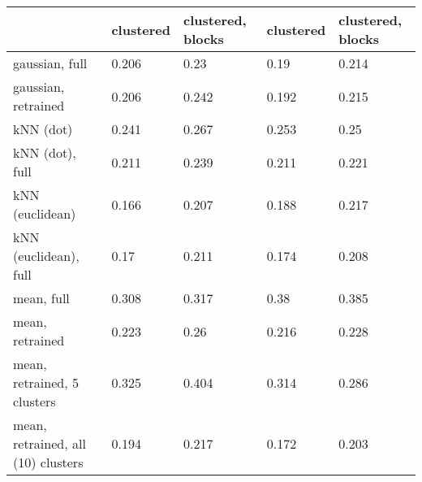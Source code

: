 \begin{tabular}{lllll}
\toprule
                                   & clustered & clustered, blocks & clustered & clustered, blocks\\
\midrule
gaussian, full                     & 0.206     & 0.23              & 0.19      & 0.214\\
gaussian, retrained                & 0.206     & 0.242             & 0.192     & 0.215\\
kNN (dot)                          & 0.241     & 0.267             & 0.253     & 0.25\\
kNN (dot), full                    & 0.211     & 0.239             & 0.211     & 0.221\\
kNN (euclidean)                    & 0.166     & 0.207             & 0.188     & 0.217\\
kNN (euclidean), full              & 0.17      & 0.211             & 0.174     & 0.208\\
mean, full                         & 0.308     & 0.317             & 0.38      & 0.385\\
mean, retrained                    & 0.223     & 0.26              & 0.216     & 0.228\\
mean, retrained, 5 clusters        & 0.325     & 0.404             & 0.314     & 0.286\\
mean, retrained, all (10) clusters & 0.194     & 0.217             & 0.172     & 0.203\\
\bottomrule
\end{tabular}

